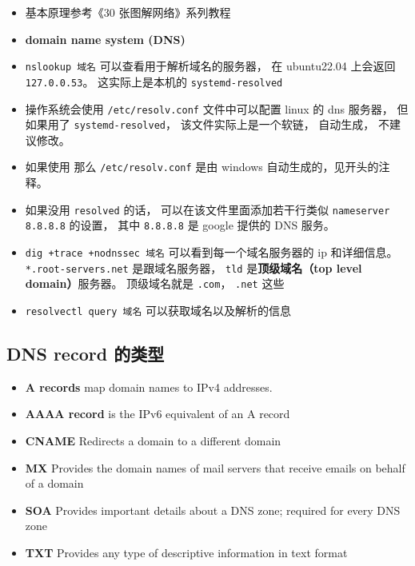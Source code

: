 
\begin{issues}
\issueDraft
\end{issues}

\begin{itemize}
\item 基本原理参考《30 张图解网络》系列教程
\item \textbf{domain name system (DNS)}
\item \verb|nslookup 域名| 可以查看用于解析域名的服务器， 在 ubuntu22.04 上会返回 \verb|127.0.0.53|。 这实际上是本机的 \verb|systemd-resolved|
\item 操作系统会使用 \verb|/etc/resolv.conf| 文件中可以配置 linux 的 dns 服务器， 但如果用了 \verb|systemd-resolved|， 该文件实际上是一个软链， 自动生成， 不建议修改。
\item 如果使用  那么 \verb|/etc/resolv.conf| 是由 windows 自动生成的，见开头的注释。
\item 如果没用 \verb|resolved| 的话， 可以在该文件里面添加若干行类似 \verb|nameserver 8.8.8.8| 的设置， 其中 \verb|8.8.8.8| 是 google 提供的 DNS 服务。
\item \verb|dig +trace +nodnssec 域名| 可以看到每一个域名服务器的 ip 和详细信息。 \verb|*.root-servers.net| 是跟域名服务器， \verb|tld| 是\textbf{顶级域名（top level domain）}服务器。 顶级域名就是 \verb|.com|， \verb|.net| 这些
\item \verb|resolvectl query 域名| 可以获取域名以及解析的信息
\end{itemize}

\subsection{DNS record 的类型}
\begin{itemize}
\item \textbf{A records} map domain names to IPv4 addresses.
\item \textbf{AAAA record} is the IPv6 equivalent of an A record
\item \textbf{CNAME}	Redirects a domain to a different domain
\item \textbf{MX} Provides the domain names of mail servers that receive emails on behalf of a domain
\item \textbf{SOA} Provides important details about a DNS zone; required for every DNS zone
\item \textbf{TXT} Provides any type of descriptive information in text format
\end{itemize}

